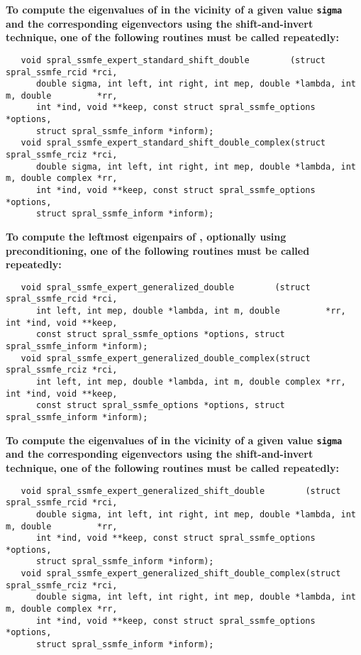 \medskip
\noindent
{\bf
To compute the eigenvalues of  %
in the vicinity of a given value {\tt sigma}
and the corresponding eigenvectors using the shift-and-invert technique,
one of the following routines must be called repeatedly:
}
\begin{verbatim}
   void spral_ssmfe_expert_standard_shift_double        (struct spral_ssmfe_rcid *rci,
      double sigma, int left, int right, int mep, double *lambda, int m, double         *rr,
      int *ind, void **keep, const struct spral_ssmfe_options *options,
      struct spral_ssmfe_inform *inform);
   void spral_ssmfe_expert_standard_shift_double_complex(struct spral_ssmfe_rciz *rci,
      double sigma, int left, int right, int mep, double *lambda, int m, double complex *rr,
      int *ind, void **keep, const struct spral_ssmfe_options *options,
      struct spral_ssmfe_inform *inform);
\end{verbatim}

\medskip
\noindent
{\bf
To compute the leftmost eigenpairs of ,
optionally using preconditioning,
one of the following routines must be called repeatedly:
}
\begin{verbatim}
   void spral_ssmfe_expert_generalized_double        (struct spral_ssmfe_rcid *rci,
      int left, int mep, double *lambda, int m, double         *rr, int *ind, void **keep,
      const struct spral_ssmfe_options *options, struct spral_ssmfe_inform *inform);
   void spral_ssmfe_expert_generalized_double_complex(struct spral_ssmfe_rciz *rci,
      int left, int mep, double *lambda, int m, double complex *rr, int *ind, void **keep,
      const struct spral_ssmfe_options *options, struct spral_ssmfe_inform *inform);
\end{verbatim}

\medskip
\noindent
{\bf
To compute the eigenvalues of  %
in the vicinity of 
a given value {\tt sigma}
and the corresponding eigenvectors using the shift-and-invert technique,
one of the following routines must be called repeatedly:
}
\begin{verbatim}
   void spral_ssmfe_expert_generalized_shift_double        (struct spral_ssmfe_rcid *rci,
      double sigma, int left, int right, int mep, double *lambda, int m, double         *rr,
      int *ind, void **keep, const struct spral_ssmfe_options *options,
      struct spral_ssmfe_inform *inform);
   void spral_ssmfe_expert_generalized_shift_double_complex(struct spral_ssmfe_rciz *rci,
      double sigma, int left, int right, int mep, double *lambda, int m, double complex *rr,
      int *ind, void **keep, const struct spral_ssmfe_options *options,
      struct spral_ssmfe_inform *inform);
\end{verbatim}

